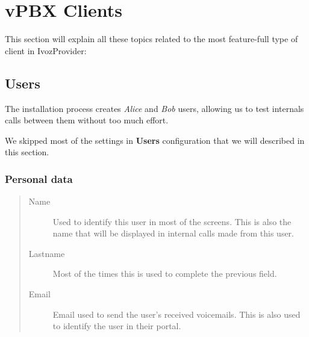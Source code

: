 \documentclass[letterpaper,10pt,english]{sphinxmanual}
\begin{document}
\section{vPBX Clients}
\label{administration_portal/client/vpbx/index:vpbx-clients}\label{administration_portal/client/vpbx/index:clientes-vpbx}\label{administration_portal/client/vpbx/index::doc}\label{administration_portal/client/vpbx/index:id1}
This section will explain all these topics related to the most feature-full type of client in IvozProvider:


\subsection{Users}
\label{administration_portal/client/vpbx/users::doc}\label{administration_portal/client/vpbx/users:users}\label{administration_portal/client/vpbx/users:id1}
The installation process creates \emph{Alice} and \emph{Bob} users, allowing us
to test internals calls between them without too much effort.

We skipped most of the settings in \textbf{Users} configuration that we will described
in this section.


\subsubsection{Personal data}
\label{administration_portal/client/vpbx/users:personal-data}\begin{quote}
\begin{description}
\item[{Name}] \leavevmode
Used to identify this user in most of the screens. This is also the
name that will be displayed in internal calls made from this user.

\item[{Lastname}] \leavevmode
Most of the times this is used to complete the previous field.

\item[{Email}] \leavevmode
Email used to send the user's received voicemails. This is also used to
identify the user in their portal.

\end{description}
\end{quote}
\end{document}
